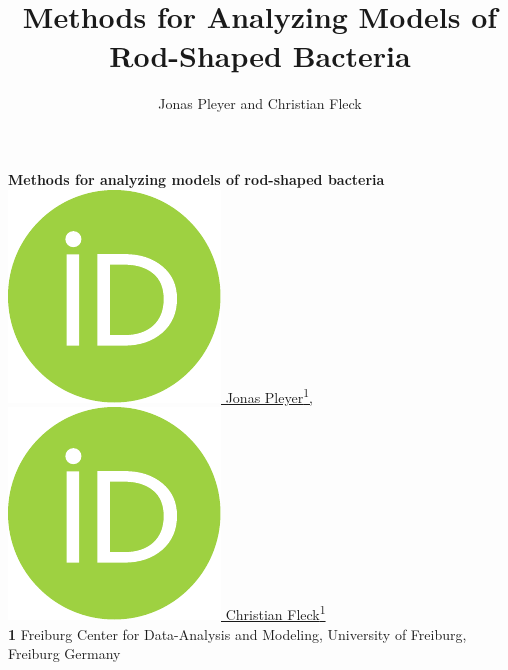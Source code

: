 \documentclass[10pt,letterpaper]{article}
\title{Methods for Analyzing Models of\\ Rod-Shaped Bacteria}
\author{Jonas Pleyer and Christian Fleck}
\begin{document}
\vspace*{0.2in}

\begin{flushleft}
{\Large
\textbf{Methods for analyzing models of rod-shaped bacteria}
}
\newline
\\
\href{https://orcid.org/0009-0001-0613-7978}{
    \includegraphics[scale=0.06]{figures/orcid.pdf}
    \hspace{1mm}Jonas Pleyer\textsuperscript{1},
}
\href{https://orcid.org/0000-0002-6371-4495}{
    \includegraphics[scale=0.06]{figures/orcid.pdf}
    \hspace{1mm}Christian Fleck\textsuperscript{1}
}
\\
\bigskip
\textbf{1} Freiburg Center for Data-Analysis and Modeling, University of Freiburg, Freiburg Germany
\\
\bigskip

\end{flushleft}

\end{document}
